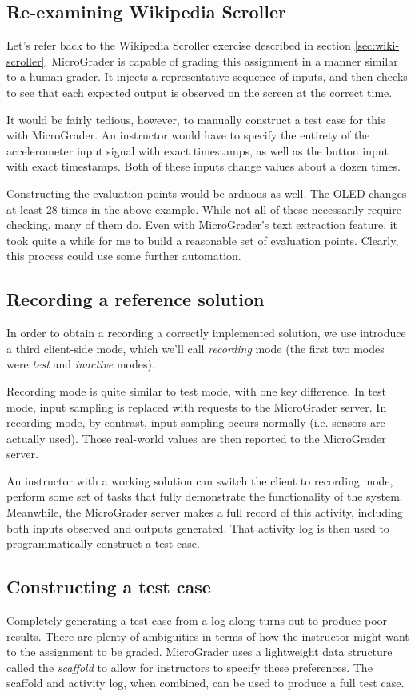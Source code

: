 \documentclass[12pt]{article}
\begin{document}
\subsection{Re-examining Wikipedia Scroller}
Let's refer back to the Wikipedia Scroller exercise described in section \ref{sec:wiki-scroller}.  MicroGrader is capable of grading this assignment in a manner similar to a human grader.  It injects a representative sequence of inputs, and then checks to see that each expected output is observed on the screen at the correct time.

It would be fairly tedious, however, to manually construct a test case for this with MicroGrader.  An instructor would have to specify the entirety of the accelerometer input signal with exact timestamps, as well as the button input with exact timestamps.  Both of these inputs change values about a dozen times.

Constructing the evaluation points would be arduous as well.  The OLED changes at least 28 times in the above example.  While not all of these necessarily require checking, many of them do.  Even with MicroGrader's text extraction feature, it took quite a while for me to build a reasonable set of evaluation points.   Clearly, this process could use some further automation.

\subsection{Recording a reference solution}
In order to obtain a recording a correctly implemented solution, we use introduce a third client-side mode, which we'll call \textit{recording} mode (the first two modes were \textit{test} and \textit{inactive} modes). 

Recording mode is quite similar to test mode, with one key difference.  In test mode, input sampling is replaced with requests to the MicroGrader server.  In recording mode, by contrast, input sampling occurs normally (i.e. sensors are actually used).  Those real-world values are then reported to the MicroGrader server.

An instructor with a working solution can switch the client to recording mode, perform some set of tasks that fully demonstrate the functionality of the system.  Meanwhile, the MicroGrader server makes a full record of this activity, including both inputs observed and outputs generated.  That activity log is then used to programmatically construct a test case.

\subsection{Constructing a test case}
Completely generating a test case from a log along turns out to produce poor results.  There are plenty of ambiguities in terms of how the instructor might want to the assignment to be graded.  MicroGrader uses a lightweight data structure called the \textit{scaffold} to allow for instructors to specify these preferences.  The scaffold and activity log, when combined, can be used to produce a full test case.
\end{document}
